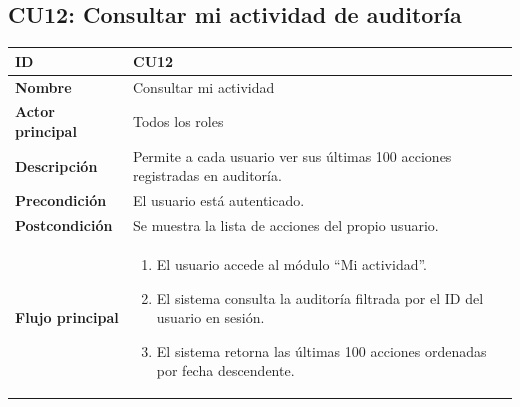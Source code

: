 \documentclass[11pt,a4paper]{article}
\begin{document}
\subsection*{CU12: Consultar mi actividad de auditoría}
\begin{longtable}{|L{3.5cm}|L{10cm}|}
    \hline
    \textbf{ID}              & CU12                                                                          \\ \hline
    \textbf{Nombre}          & Consultar mi actividad                                                        \\ \hline
    \textbf{Actor principal} & Todos los roles                                                               \\ \hline
    \textbf{Descripción}     & Permite a cada usuario ver sus últimas 100 acciones registradas en auditoría. \\ \hline
    \textbf{Precondición}    & El usuario está autenticado.                                                  \\ \hline
    \textbf{Postcondición}   & Se muestra la lista de acciones del propio usuario.                           \\ \hline
    \textbf{Flujo principal} &
    \begin{enumerate}
        \item El usuario accede al módulo ``Mi actividad''.
        \item El sistema consulta la auditoría filtrada por el ID del usuario en sesión.
        \item El sistema retorna las últimas 100 acciones ordenadas por fecha descendente.
    \end{enumerate}                    \\ \hline
\end{longtable}

\end{document}
